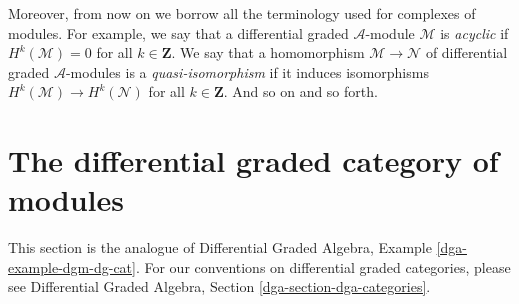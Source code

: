 \documentclass{stacks-project}
\theoremstyle{plain}
\theoremstyle{definition}
\theoremstyle{remark}
\numberwithin{equation}{subsection}
\begin{document}
\medskip\noindent
Moreover, from now on we borrow all the terminology used for
complexes of modules. For example, we say that a differential
graded $\mathcal{A}$-module $\mathcal{M}$ is {\it acyclic} if
$H^k(\mathcal{M}) = 0$ for all $k \in \mathbf{Z}$. We say that a
homomorphism $\mathcal{M} \to \mathcal{N}$
of differential graded $\mathcal{A}$-modules is a {\it quasi-isomorphism}
if it induces isomorphisms $H^k(\mathcal{M}) \to H^k(\mathcal{N})$
for all $k \in \mathbf{Z}$. And so on and so forth.


















\section{The differential graded category of modules}
\label{section-dgm-dg-cat}

\noindent
This section is the analogue of
Differential Graded Algebra, Example \ref{dga-example-dgm-dg-cat}.
For our conventions on differential graded categories, please
see Differential Graded Algebra, Section \ref{dga-section-dga-categories}.
\end{document}
